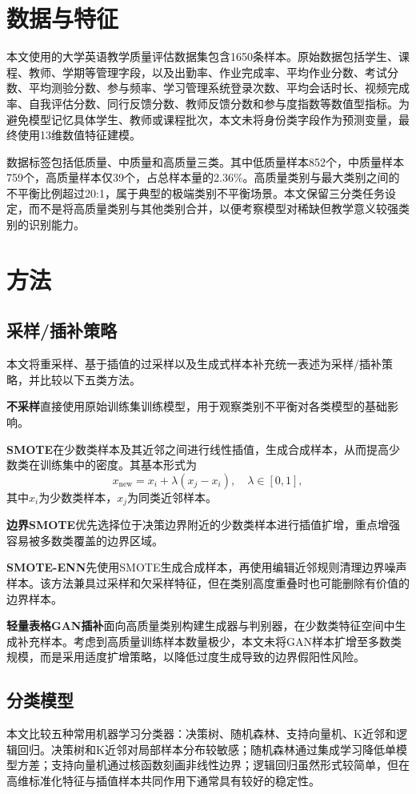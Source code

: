 \documentclass[UTF8,a4paper,12pt,fontset=fandol]{ctexart}
\begin{document}
\section{数据与特征}
本文使用的大学英语教学质量评估数据集包含1650条样本。原始数据包括学生、课程、教师、学期等管理字段，以及出勤率、作业完成率、平均作业分数、考试分数、平均测验分数、参与频率、学习管理系统登录次数、平均会话时长、视频完成率、自我评估分数、同行反馈分数、教师反馈分数和参与度指数等数值型指标。为避免模型记忆具体学生、教师或课程批次，本文未将身份类字段作为预测变量，最终使用13维数值特征建模。

数据标签包括低质量、中质量和高质量三类。其中低质量样本852个，中质量样本759个，高质量样本仅39个，占总样本量的2.36\%。高质量类别与最大类别之间的不平衡比例超过20:1，属于典型的极端类别不平衡场景。本文保留三分类任务设定，而不是将高质量类别与其他类别合并，以便考察模型对稀缺但教学意义较强类别的识别能力。

\section{方法}
\subsection{采样/插补策略}
本文将重采样、基于插值的过采样以及生成式样本补充统一表述为采样/插补策略，并比较以下五类方法。

\textbf{不采样}直接使用原始训练集训练模型，用于观察类别不平衡对各类模型的基础影响。

\textbf{SMOTE}在少数类样本及其近邻之间进行线性插值，生成合成样本，从而提高少数类在训练集中的密度。其基本形式为
\begin{equation}
    x_{\mathrm{new}} = x_i + \lambda(x_j-x_i), \quad \lambda \in [0,1],
\end{equation}
其中$x_i$为少数类样本，$x_j$为同类近邻样本。

\textbf{边界SMOTE}优先选择位于决策边界附近的少数类样本进行插值扩增，重点增强容易被多数类覆盖的边界区域。

\textbf{SMOTE-ENN}先使用SMOTE生成合成样本，再使用编辑近邻规则清理边界噪声样本。该方法兼具过采样和欠采样特征，但在类别高度重叠时也可能删除有价值的边界样本。

\textbf{轻量表格GAN插补}面向高质量类别构建生成器与判别器，在少数类特征空间中生成补充样本。考虑到高质量训练样本数量极少，本文未将GAN样本扩增至多数类规模，而是采用适度扩增策略，以降低过度生成导致的边界假阳性风险。

\subsection{分类模型}
本文比较五种常用机器学习分类器：决策树、随机森林、支持向量机、K近邻和逻辑回归。决策树和K近邻对局部样本分布较敏感；随机森林通过集成学习降低单模型方差；支持向量机通过核函数刻画非线性边界；逻辑回归虽然形式较简单，但在高维标准化特征与插值样本共同作用下通常具有较好的稳定性。
\end{document}
